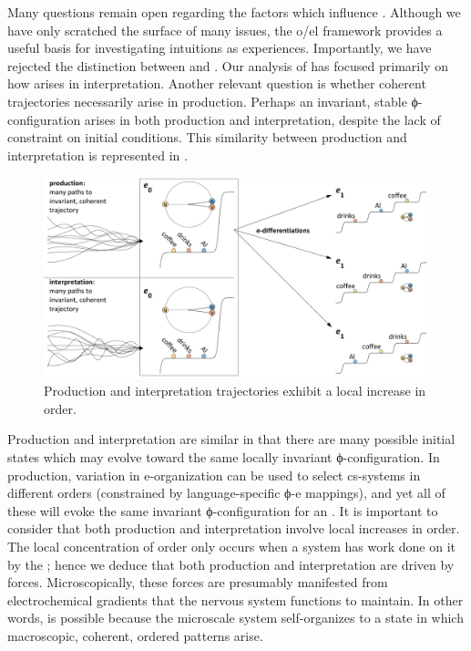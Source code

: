   Many questions remain open regarding the factors which influence . Although we have only scratched the surface of many issues, the o/el framework provides a useful basis for investigating intuitions as experiences. Importantly, we have rejected the distinction between  and . Our analysis of  has focused primarily on how  arises in interpretation. Another relevant question is whether coherent trajectories necessarily arise in production. Perhaps an invariant, stable ϕ-configuration arises in both production and interpretation, despite the lack of constraint on initial conditions. This similarity between production and interpretation is represented in {}.

  
\begin{figure}
\includegraphics[width=\textwidth]{figures/Tilsen-img135.png}
\caption{Production and interpretation trajectories exhibit a local increase in order.}
\label{fig:6:16}
\end{figure}
 

  Production and interpretation are similar in that there are many possible initial states which may evolve toward the same locally invariant ϕ-configuration. In production, variation in e-organization can be used to select cs-systems in different orders (constrained by language-specific ϕ-e mappings), and yet all of these will evoke the same invariant ϕ-configuration for an . It is important to consider that both production and interpretation involve local increases in order. The local concentration of order only occurs when a system has work done on it by the ; hence we deduce that both production and interpretation are driven by  forces. Microscopically, these forces are presumably manifested from electrochemical gradients that the nervous system functions to maintain. In other words,  is possible because the microscale system self-organizes to a state in which macroscopic, coherent, ordered patterns arise.

